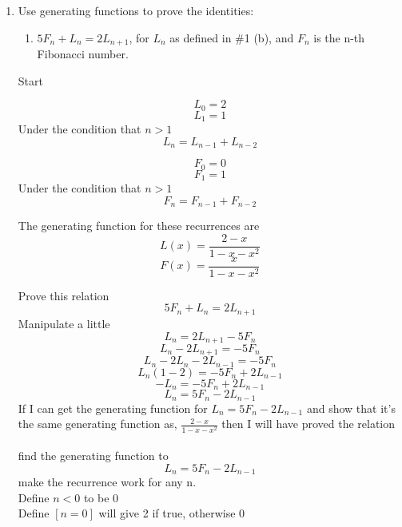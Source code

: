 \documentclass[10pt, AMS Euler]{article}
\begin{document}
        \newpage
        \begin{enumerate}[resume]
		\item Use generating functions to prove the identities:
		\begin{enumerate}
			\item $5F_n + L_n = 2L_{n+1}$, for $L_n$ as defined in \#1 (b), and $F_n$ is the n-th Fibonacci number.
            \end{enumerate} 

            Start
            
            $$ L_0 = 2 $$
            $$ L_1 = 1 $$
            Under the condition that $n>1$
            $$ L_n = L_{n-1} + L_{n-2} $$

            $$ F_0 = 0 $$
            $$ F_1 = 1 $$
            Under the condition that $n>1$
            $$ F_n = F_{n-1} + F_{n-2} $$

            The generating function for these recurrences are
            $$ L(x) = \frac{2-x}{ 1 - x - x^2 } $$
            $$ F(x) = \frac{x}{1-x-x^2} $$

            Prove this relation
            $$ 5F_n + L_n = 2L_{n+1} $$
            Manipulate a little
            $$ L_n = 2L_{n+1} - 5F_n $$
            $$ L_n - 2L_{n+1} = - 5F_n $$
            $$ L_n - 2 L_{n} - 2 L_{n-1} = - 5F_n $$
            $$ L_n(1 - 2) = - 5F_n  + 2 L_{n-1} $$
            $$ -L_n = - 5F_n  + 2 L_{n-1} $$
            $$ L_n = 5F_n  - 2 L_{n-1} $$
            If I can get the generating function for $ L_n = 5F_n  - 2 L_{n-1} $ and show that it's the same generating function as, $\frac{2-x}{ 1 - x - x^2 }$ then I will have proved the relation \\
            \\
            find the generating function to 
            $$ L_n = 5F_n  - 2 L_{n-1} $$
            make the recurrence work for any n. \\
            Define $n<0$ to be 0 \\
            Define $[n=0]$ will give 2 if true, otherwise 0


\end{enumerate}
\end{document}
